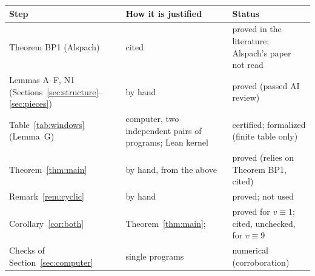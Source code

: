 \documentclass[11pt]{amsart}
\theoremstyle{plain}
\theoremstyle{definition}
\theoremstyle{remark}
\numberwithin{equation}{section}
\begin{document}
\begin{center}
\small
\begin{tabular}{>{\raggedright\arraybackslash}p{}>{\raggedright\arraybackslash}p{}>{\raggedright\arraybackslash}p{}}
\toprule
Step & How it is justified & Status \\
\midrule
Theorem BP1 (Alspach) & cited \cite{BP,Als} & proved in the literature; Alspach's paper not read \\
Lemmas A--F, N1 (Sections~\ref{sec:structure}--\ref{sec:pieces}) & by hand & proved (passed AI review) \\
Table~\ref{tab:windows} (Lemma~G) & computer, two independent pairs of programs; Lean kernel & certified; formalized (finite table only) \\
Theorem~\ref{thm:main} & by hand, from the above & proved (relies on Theorem BP1, cited) \\
Remark~\ref{rem:cyclic} & by hand & proved; not used \\
Corollary~\ref{cor:both} & Theorem~\ref{thm:main}; \cite[Thm.~4.1]{DPP} & proved for \(v\equiv1\); cited, unchecked, for \(v\equiv9\) \\
Checks of Section~\ref{sec:computer} & single programs & numerical (corroboration) \\
\bottomrule
\end{tabular}
\end{center}
\end{document}
